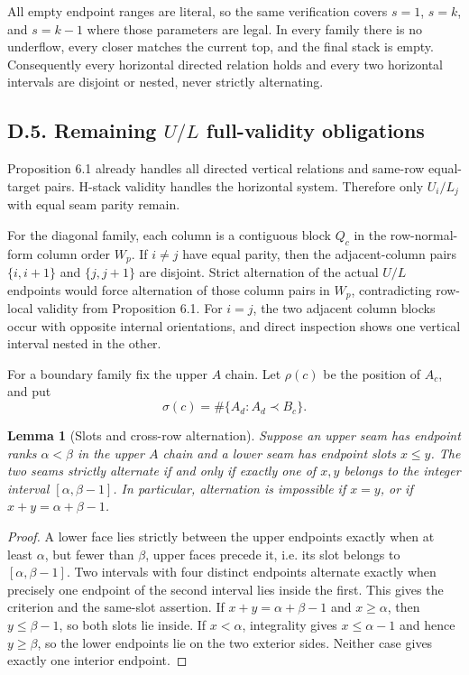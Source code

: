 \documentclass[11pt]{article}
\newtheorem{lemma}[theorem]{Lemma}
\theoremstyle{definition}
\theoremstyle{remark}
\begin{document}
All empty endpoint ranges are literal, so the same verification covers
\(s=1\), \(s=k\), and \(s=k-1\) where those parameters are legal. In
every family there is no underflow, every closer matches the current
top, and the final stack is empty. Consequently every horizontal
directed relation holds and every two horizontal intervals are disjoint
or nested, never strictly alternating.

\subsection{\texorpdfstring{D.5. Remaining \(U/L\) full-validity
obligations}{D.5. Remaining U/L full-validity obligations}}\label{d.5.-remaining-ul-full-validity-obligations}

Proposition 6.1 already handles all directed vertical relations and
same-row equal-target pairs. H-stack validity handles the horizontal
system. Therefore only $U_i/L_j$ with equal seam parity remain.

For the diagonal family, each column is a contiguous block $Q_c$ in
the row-normal-form column order $W_p$. If $i\ne j$ have equal parity,
then the adjacent-column pairs $\{i,i+1\}$ and $\{j,j+1\}$ are disjoint.
Strict alternation of the actual $U/L$ endpoints would force alternation
of those column pairs in $W_p$, contradicting row-local validity from
Proposition 6.1. For $i=j$, the two adjacent column blocks occur with
opposite internal orientations, and direct inspection shows one vertical
interval nested in the other.

For a boundary family fix the upper $A$ chain. Let $\rho(c)$ be the
position of $A_c$, and put
\[
\sigma(c)=\#\{A_d:A_d\prec B_c\}.
\]

\begin{lemma}[Slots and cross-row alternation]\label{lem:per2-slots}
Suppose an upper seam has endpoint ranks $\alpha<\beta$ in the upper
$A$ chain and a lower seam has endpoint slots $x\le y$. The two seams
strictly alternate if and only if exactly one of $x,y$ belongs to the
integer interval $[\alpha,\beta-1]$. In particular, alternation is
impossible if $x=y$, or if $x+y=\alpha+\beta-1$.
\end{lemma}
\begin{proof}
A lower face lies strictly between the upper endpoints exactly when at
least $\alpha$, but fewer than $\beta$, upper faces precede it, i.e. its
slot belongs to $[\alpha,\beta-1]$. Two intervals with four distinct
endpoints alternate exactly when precisely one endpoint of the second
interval lies inside the first. This gives the criterion and the same-slot
assertion. If $x+y=\alpha+\beta-1$ and $x\ge\alpha$, then
$y\le\beta-1$, so both slots lie inside. If $x<\alpha$, integrality gives
$x\le\alpha-1$ and hence $y\ge\beta$, so the lower endpoints lie on the
two exterior sides. Neither case gives exactly one interior endpoint.
\end{proof}
\end{document}
